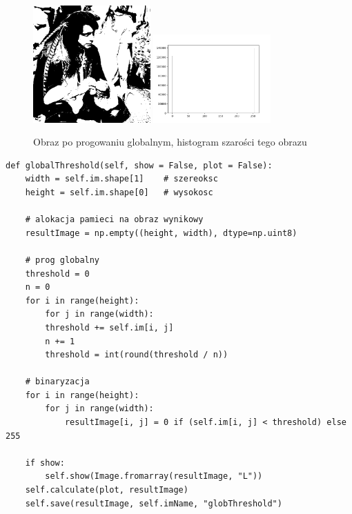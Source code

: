 \documentclass[final,a4paper,openany,12pt]{mwbk}
\begin{document}
\begin{figure}[H]
	\begin{center}
		\includegraphics[width=0.4\textwidth]{pirate_gray_globThreshold_result}
		\includegraphics[width=0.4\textwidth]{pirate_gray_globThreshold_histogram}
	\end{center}
	\caption{Obraz po progowaniu globalnym, histogram szarości tego obrazu}
\end{figure}

\begin{lstlisting}[caption=Progowanie globalne]
def globalThreshold(self, show = False, plot = False):
	width = self.im.shape[1]    # szereoksc
	height = self.im.shape[0]   # wysokosc
	
	# alokacja pamieci na obraz wynikowy
	resultImage = np.empty((height, width), dtype=np.uint8)
	
	# prog globalny
	threshold = 0
	n = 0
	for i in range(height):
		for j in range(width):
		threshold += self.im[i, j]
		n += 1
		threshold = int(round(threshold / n))
	
	# binaryzacja
	for i in range(height):
		for j in range(width):
			resultImage[i, j] = 0 if (self.im[i, j] < threshold) else 255
	
	if show:
		self.show(Image.fromarray(resultImage, "L"))
	self.calculate(plot, resultImage)
	self.save(resultImage, self.imName, "globThreshold")
\end{lstlisting}
\newpage
\end{document}
